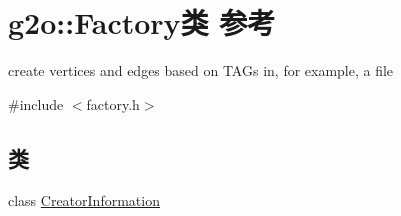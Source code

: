 \hypertarget{classg2o_1_1Factory}{\section{g2o\-:\-:Factory类 参考}
\label{classg2o_1_1Factory}
}


create vertices and edges based on T\-A\-Gs in, for example, a file  




{\ttfamily \#include $<$factory.\-h$>$}

\subsection*{类}
\begin{DoxyCompactItemize}
\item 
class \hyperlink{classg2o_1_1Factory_1_1CreatorInformation}{Creator\-Information}
\end{DoxyCompactItemize}
